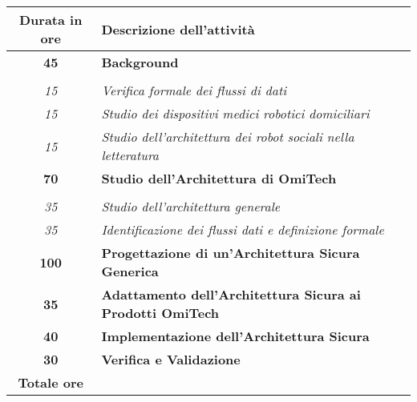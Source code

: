 

\begin{tabularx}{\textwidth}{|c|X|}
	\hline
	\textbf{Durata in ore} & \textbf{Descrizione dell'attività} \\\hline
	
	\textbf{45} & \textbf{Background} \\
    \hdashline
    \multirow{3}{0cm}\\
    \textit{15} & \textit{Verifica formale dei flussi di dati} \\
    \textit{15} & \textit{Studio dei dispositivi medici robotici domiciliari} \\
    \textit{15} & \textit{Studio dell'architettura dei robot sociali nella letteratura}\\	 
    \hline
    
    \textbf{70} & \textbf{Studio dell'Architettura di OmiTech} \\ \hdashline 
    \multirow{2}{0cm}\\ 
    \textit{35} & 
    \textit{Studio dell'architettura generale} \\
    \textit{35} & 
    \textit{Identificazione dei flussi dati e definizione formale} \\
    \hline
    
    \textbf{100} & \textbf{Progettazione di un'Architettura Sicura Generica}  \\  
    \hline

    \textbf{35} & \textbf{Adattamento dell'Architettura Sicura ai Prodotti OmiTech}  \\  
    \hline

    \textbf{40} & \textbf{Implementazione dell'Architettura Sicura}  \\  
    \hline

    \textbf{30} & \textbf{Verifica e Validazione}  \\  
    \hline
	
	\textbf{Totale ore} & \multicolumn{1}{|c|}{\textbf{\totaleOre}} \\\hline
	
	
\end{tabularx}